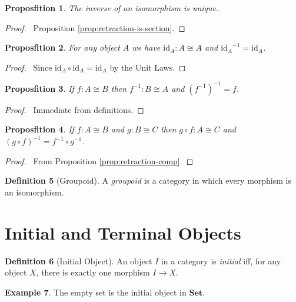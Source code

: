 \documentclass{book}
\let\qed\relax
\newtheorem{prop}{Proposfition}[chapter]
\theoremstyle{definition}
\newtheorem{df}[prop]{Definition}
\newtheorem{ex}[prop]{Example}
\newcommand{\id}[1]{\ensuremath{\mathrm{id}_{#1}}}
\newcommand{\inv}[1]{\ensuremath{{#1}^{-1}}}
\newcommand{\Set}{\ensuremath{\mathbf{Set}}}
\begin{document}
\begin{prop}
    \label{prop:inv-unique}
    The inverse of an isomorphism is unique.
\end{prop}

\begin{proof}
    \pf\ Proposition \ref{prop:retraction-is-section}. \qed
\end{proof}

\begin{prop}
    For any object $A$ we have $\id{A} : A \cong A$ and $\id{A}^{-1} = \id{A}$.
\end{prop}

\begin{proof}
    \pf\ Since $\id{A} \circ \id{A} = \id{A}$ by the Unit Laws. \qed
\end{proof}

\begin{prop}
    If $f : A \cong B$ then $f^{-1} : B \cong A$ and $(f^{-1})^{-1} = f$.
\end{prop}

\begin{proof}
    \pf\ Immediate from definitions. \qed
\end{proof}

\begin{prop}
    If $f : A \cong B$ and $g : B \cong C$ then $g \circ f : A \cong C$ and $\inv{(g \circ f)} = \inv{f} \circ \inv{g}$.
\end{prop}

\begin{proof}
    \pf\ From Proposition \ref{prop:retraction-comp}. \qed
\end{proof}

\begin{df}[Groupoid]
    A \emph{groupoid} is a category in which every morphism is an isomorphism.
\end{df}

\section{Initial and Terminal Objects}

\begin{df}[Initial Object]
    An object $I$ in a category is \emph{initial} iff, for any object $X$, there is exactly one morphism $I \rightarrow X$.
\end{df}

\begin{ex}
    The empty set is the initial object in $\Set$.
\end{ex}
\end{document}
